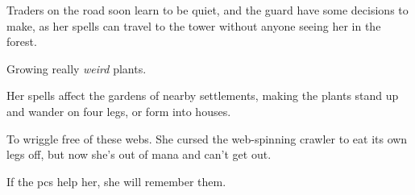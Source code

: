 \begin{multicols}{2}
\begin{dlist}
  Traders on the road soon learn to be quiet, and the \gls{guard} have some decisions to make, as her spells can travel to the tower without anyone seeing her in the forest.
  \item
  Growing really \emph{weird} plants.

  Her spells affect the gardens of nearby settlements, making the plants stand up and wander on four legs, or form into houses.
  \item
  To wriggle free of these webs.
  She cursed the web-spinning \gls{crawler} to eat its own legs off, but now she's out of mana and can't get out.

  If the \glspl{pc} help her, she will remember them.
\end{dlist}

\end{multicols}

\section{}
\label{ogre}

